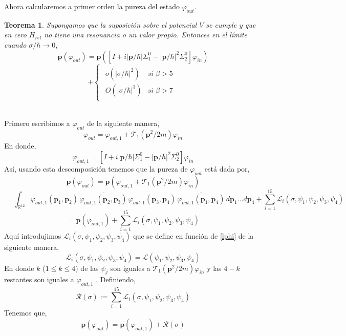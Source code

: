 \documentclass[12pt]{book}
\numberwithin{equation}{chapter}
\newtheorem{theorem}{Teorema}[chapter]
\def\n{\noindent}
\def\ol{\overline}
\def\R{\mathbb{R}}
\def\T{\mathcal{T}}
\def\L{\mathcal{L}}
\def\Rr{\mathcal{R}}
\def\vp{\varphi}
\def\P{\mathbf{p}}
\begin{document}
\n Ahora calcularemos a primer orden la pureza del estado $\vp_{out}$.
\begin{theorem}
Supongamos que la suposici\'on sobre el potencial $V$ se cumple y que en cero $H_{rel}$ no tiene una resonancia o un valor propio. Entonces en el l\'imite cuando $\sigma/\hbar \rightarrow 0 $,
$$ \P( \vp_{out} )= \P \left( \left[ I+i|\P/\hbar|\Sigma_{1}^{0} -|\P/\hbar|^{2} \Sigma_{2}^{0} \right] \vp_{in} \right) $$
\begin{equation}\label{1.4.0}
+\begin{cases} \begin{matrix} o(|\sigma/\hbar|^{2}) & si\; \beta >5 \\ O(|\sigma/\hbar|^{3}) & si\; \beta > 7 \end{matrix} \end{cases}
\end{equation}

\end{theorem}
\n {\bf Demostraci\'on}\\
Primero escribimos a $\vp_{out}$ de la siguiente manera,
$$ \vp_{out}= \vp_{out,1} + \T_{1} (\P^{2}/2m) \vp_{in} $$
En donde,
\begin{equation}
\vp_{out,1}= \left[I + i|\P/\hbar| \Sigma_{1}^{0} - |\P/\hbar|^{2} \Sigma_{2}^{0} \right] \vp_{in}
\end{equation}
As\'i, usando esta descomposici\'on tenemos que la pureza de $\vp_{out}$ est\'a dada por,
$$ \P (\vp_{out})= \P \left(\vp_{out,1} + \T_{1} (\P^{2}/2m) \vp_{in} \right) $$
$$= \int_{\R^{12}} \vp_{out,1}(\P_{1},\P_{2}) \, \ol{ \vp_{out,1}(\P_{2},\P_{3}) } \, \vp_{out,1}(\P_{3},\P_{4}) \, \ol{ \vp_{out,1}(\P_{1},\P_{4}) } \, d\P_{1} ... d\P_{4} + \sum_{i=1}^{15} \L_{i}(\sigma, \psi_{1},\psi_{2},\psi_{3},\psi_{4}) $$
$$= \P(\vp_{out,1}) + \sum_{i=1}^{15} \L_{i}(\sigma, \psi_{1},\psi_{2},\psi_{3},\psi_{4}) $$
Aqu\'i introdujimos $\L_{i}(\sigma, \psi_{1},\psi_{2},\psi_{3},\psi_{4})$ que se define en funci\'on de \eqref{lphi} de la siguiente manera,
$$ \L_{i}(\sigma, \psi_{1},\psi_{2},\psi_{3},\psi_{4})=\L( \psi_{1},\psi_{2},\psi_{3},\psi_{4}) $$
En donde $k$ ($ 1 \leq k \leq 4 $) de las $\psi_{j}$ son iguales a $\T_{1}(\P^{2}/2m) \vp_{in} $ y las $4-k$ restantes son iguales a $\vp_{out,1}$ . Definiendo,
\begin{equation}\label{1.4.4}
\Rr(\sigma):= \sum_{i=1}^{15} \L_{i}(\sigma, \psi_{1},\psi_{2},\psi_{3},\psi_{4})
\end{equation}
Tenemos que,
\begin{equation}\label{1.4.5}
\P (\vp_{out})= \P(\vp_{out,1})+\Rr (\sigma)
\end{equation}
\end{document}
